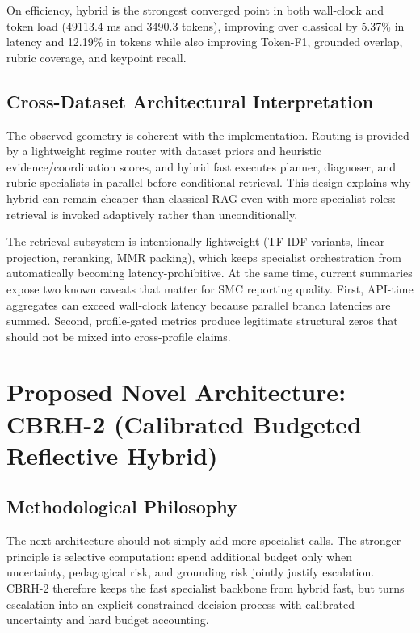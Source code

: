 On efficiency, hybrid is the strongest converged point in both wall-clock and token load (49113.4 ms and 3490.3 tokens), improving over classical by 5.37\% in latency and 12.19\% in tokens while also improving Token-F1, grounded overlap, rubric coverage, and keypoint recall.

\subsection{Cross-Dataset Architectural Interpretation}
The observed geometry is coherent with the implementation. Routing is provided by a lightweight regime router with dataset priors and heuristic evidence/coordination scores, and hybrid fast executes planner, diagnoser, and rubric specialists in parallel before conditional retrieval. This design explains why hybrid can remain cheaper than classical RAG even with more specialist roles: retrieval is invoked adaptively rather than unconditionally.

The retrieval subsystem is intentionally lightweight (TF-IDF variants, linear projection, reranking, MMR packing), which keeps specialist orchestration from automatically becoming latency-prohibitive. At the same time, current summaries expose two known caveats that matter for SMC reporting quality. First, API-time aggregates can exceed wall-clock latency because parallel branch latencies are summed. Second, profile-gated metrics produce legitimate structural zeros that should not be mixed into cross-profile claims.

\section{Proposed Novel Architecture: CBRH-2 (Calibrated Budgeted Reflective Hybrid)}

\subsection{Methodological Philosophy}
The next architecture should not simply add more specialist calls. The stronger principle is selective computation: spend additional budget only when uncertainty, pedagogical risk, and grounding risk jointly justify escalation. CBRH-2 therefore keeps the fast specialist backbone from hybrid fast, but turns escalation into an explicit constrained decision process with calibrated uncertainty and hard budget accounting.

